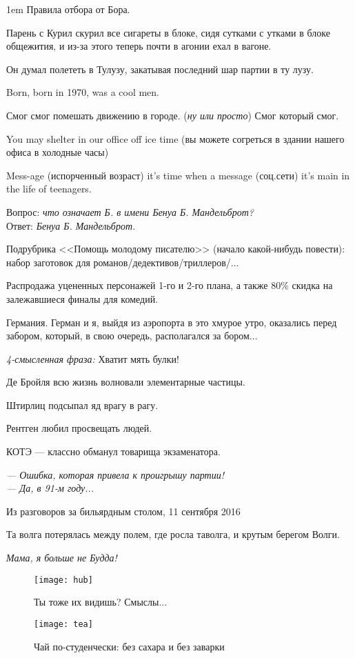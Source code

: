 \begin{flushleft}\parskip1em
    Правила отбора от Бора.

    Парень с Курил скурил все сигареты в блоке, сидя сутками с утками в блоке общежития, и из-за этого теперь почти в агонии ехал в вагоне.

    Он думал полететь в Тулузу, закатывая последний шар партии в ту лузу.

    Born, born in 1970, was a cool men.

    Смог смог помешать движению в городе. (\emph{ну или просто}) Смог который смог.

    You may shelter in our office off ice time (вы можете согреться в здании нашего офиса в холодные часы)

    Mess-age (испорченный возраст) it's time when a message (соц.сети) it's main in the life of teenagers.

    Вопрос: \emph{что означает Б. в имени Бенуа Б. Мандельброт?}\\
    Ответ: \emph{Бенуа Б. Мандельброт.}

    Подрубрика <<Помощь молодому писателю>> (начало какой-нибудь повести): набор заготовок для романов/дедективов/триллеров/...

    Распродажа уцененных персонажей 1-го и 2-го плана, а также 80\% скидка на залежавшиеся финалы для комедий.

    Германия. Герман и я, выйдя из аэропорта в это хмурое утро, оказались перед забором, который, в свою очередь, располагался за бором...

    \emph{4-смысленная фраза:} Хватит мять булки!

    Де Бройля всю жизнь волновали элементарные частицы.

    Штирлиц подсыпал яд врагу в рагу.

    Рентген любил просвещать людей.

    КОТЭ --- классно обманул товарища экзаменатора.

    \emph{--- Ошибка, которая привела к проигрышу партии!\\
    --- Да, в 91-м году...}
    \vspace*{-1em}\begin{flushright}
        Из разговоров за бильярдным столом, 11 сентября 2016
    \end{flushright}

    Та волга потерялась между полем, где росла таволга, и крутым берегом Волги. %

    \emph{Мама, я больше не Будда!}
\end{flushleft}
\begin{figure}[ht!]
    \centering
    \texttt{[image: hub]}
    \caption{Ты тоже их видишь? Смыслы...}
\end{figure}
\begin{figure}[ht!]
    \centering
    \texttt{[image: tea]}
    \caption{Чай по-студенчески: без сахара и без заварки}
\end{figure}

